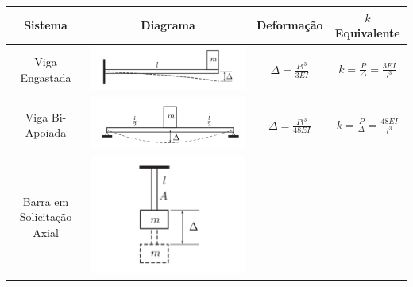 \documentclass{article}
\begin{document}
                \begin{table}[h]
                    \centering
                    \begin{tabular}{|c|c|c|c|}
                        \hline
                        Sistema & Diagrama & Deformação & $k$ Equivalente \\ \hline
                        Viga Engastada &
                        \begin{minipage}{.45\textwidth}
                                \includegraphics[width=\linewidth]{imgs/mola_eq_1.png}
                        \end{minipage}
                        &
                        $    \Delta = \frac{Pl^3}{3EI}$ 
                        &
                        $   k = \frac{P}{\Delta} = \frac{3EI}{l^3}$ \\ \hline
                        Viga Bi-Apoiada & 
                        \begin{minipage}{.45\textwidth}
                            \includegraphics[width=\linewidth]{imgs/mola_eq_2.png}
                        \end{minipage}
                        &
                        $\Delta = \frac{Pl^3}{48EI}$
                        &
                        $k = \frac{P}{\Delta} = \frac{48EI}{l^3}$ \\ \hline 
                        Barra em Solicitação Axial & 
                        \begin{minipage}{.45\textwidth}
                            \centering
                            \includegraphics[width=.5\linewidth]{imgs/mola_eq_3.png}

\end{minipage}
\end{tabular}
\end{table}
\end{document}
